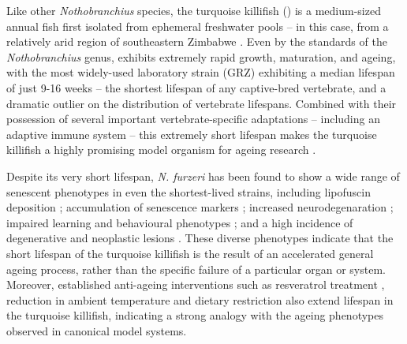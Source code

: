 Like other \textit{Nothobranchius} species, the turquoise killifish (\nfu) is a medium-sized annual fish first isolated from ephemeral freshwater pools -- in this case, from a relatively arid region of southeastern Zimbabwe \parencite{jubb1971new,genade2005annual}. Even by the standards of the \textit{Nothobranchius} genus, \Nfu exhibits extremely rapid growth, maturation, and ageing, with the most widely-used laboratory strain (GRZ) exhibiting a median lifespan of just 9-16 weeks \parencite{valdesalici2003lifespan,genade2005annual,terzibasi2008strains,kirschner2012map,valenzano2015genome,smith2017microbiota} -- the shortest lifespan of any captive-bred vertebrate, and a dramatic outlier on the distribution of vertebrate lifespans. %
Combined with their possession of several important vertebrate-specific adaptations -- including an adaptive immune system -- this extremely short lifespan makes the turquoise killifish a highly promising model organism for ageing research \parencite{harel2015crispr}.

Despite its very short lifespan, \textit{N. furzeri} has been found to show a wide range of senescent phenotypes in even the shortest-lived strains, including lipofuscin deposition \parencite{genade2005annual};  accumulation of senescence markers \parencite{genade2005annual};  increased neurodegenaration \parencite{valenzano2006resveratrol1,valenzano2006resveratrol2}; impaired learning and behavioural phenotypes  \parencite{genade2005annual,valenzano2006resveratrol1}; %
and a high incidence of degenerative and neoplastic lesions \parencite{dicicco2011histopathology}. These diverse phenotypes indicate that the short lifespan of the turquoise killifish is the result of an accelerated general ageing process, rather than the specific failure of a particular organ or system. Moreover, established anti-ageing interventions such as resveratrol treatment \parencite{valenzano2006resveratrol1}, reduction in ambient temperature \parencite{valenzano2006temperature} and dietary restriction \parencite{terzibasi2009dr} also extend lifespan in the turquoise killifish, indicating a strong analogy with the ageing phenotypes observed in canonical model systems.

